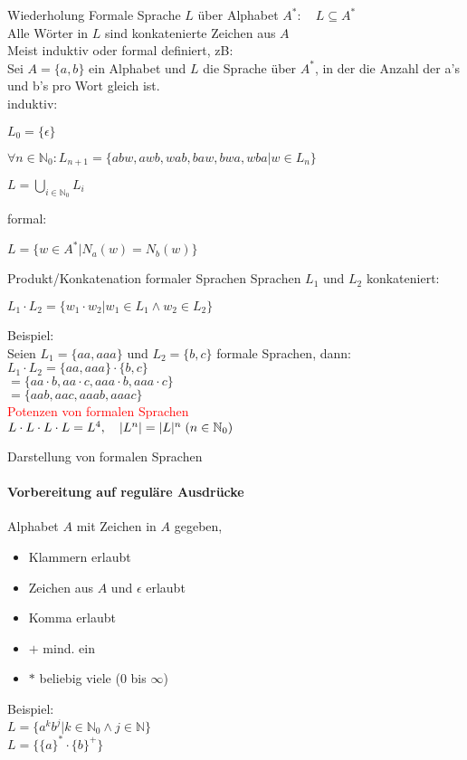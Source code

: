 \begin{frame}{Wiederholung}
	Formale Sprache $L$ über Alphabet $A^{\ast}: \quad L\subseteq A^{\ast}$\\
	Alle Wörter in $L$ sind konkatenierte Zeichen aus $A$\\
	Meist induktiv oder formal definiert, zB:\\
	Sei $A=\{a,b\}$ ein Alphabet und $L$ die Sprache über $A^{\ast}$, in der die Anzahl der a's und b's pro Wort gleich ist.\\
	induktiv:
	\centerline{$L_{0}=\{\epsilon\}$}
	\centerline{$\forall n\in\mathbb{N}_{0}:L_{n+1}=\{abw,awb,wab,baw,bwa,wba\vert w\in L_{n}\}$}
	\centerline{$L=\bigcup\limits_{i\in\mathbb{N}_{0}}L_{i}$}
	formal:
	\centerline{$L=\{w\in A^{\ast}\vert N_{a}(w)=N_{b}(w)\}$}
\end{frame}

\begin{frame}{Produkt/Konkatenation formaler Sprachen}
	Sprachen $L_{1}$ und $L_{2}$ konkateniert:\\
	\centerline{$L_{1}\cdot L_{2}=\{w_{1}\cdot w_{2}\vert w_{1}\in L_{1}\wedge w_{2}\in L_{2}\}$}
	Beispiel:\\
	Seien $L_{1}=\{aa, aaa\}$ und $L_{2}=\{b,c\}$ formale Sprachen, dann:\\
	$L_{1}\cdot L_{2}=\{aa,aaa\}\cdot\{b,c\}$\\
	\hspace{11.5mm}$=\{aa\cdot b,aa\cdot c,aaa\cdot b,aaa\cdot c\}$\\
	\hspace{11.5mm}$=\{aab,aac,aaab,aaac\}$\\
	\textcolor{red}{Potenzen von formalen Sprachen}\\
	$L\cdot L\cdot L\cdot L=L^{4},\quad\lvert L^{n}\rvert=\lvert L\rvert^{n}\thickspace(n\in\mathbb{N}_{0})$\\
\end{frame}
\begin{frame}{Darstellung von formalen Sprachen}
	\framesubtitle{Vorbereitung auf reguläre Ausdrücke}
	Alphabet $A$ mit Zeichen in $A$ gegeben,\\
	\begin{itemize}
		\item Klammern erlaubt
		\item Zeichen aus $A$ und $\epsilon$ erlaubt
		\item Komma erlaubt
		\item $+$ mind. ein
		\item $\ast$ beliebig viele ($0$ bis $\infty$)
	\end{itemize}
	Beispiel:\\
	$L=\{a^{k}b^{j}\vert k\in\mathbb{N}_{0}\wedge j\in\mathbb{N}\}$\\
	$L=\{\{a\}^{\ast}\cdot\{b\}^{+}\}$\\
\end{frame}

